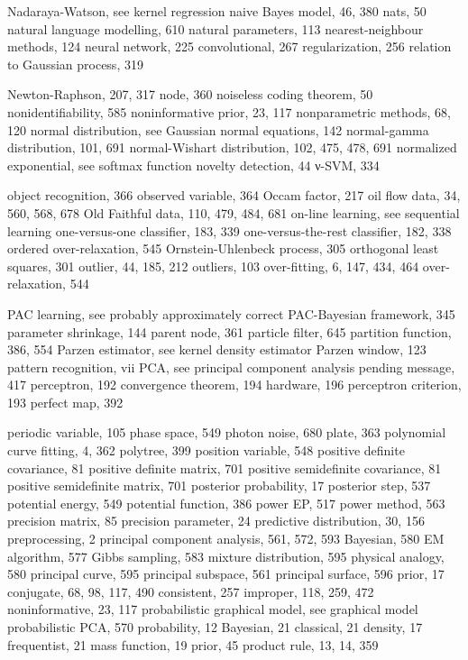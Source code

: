 \documentclass[
  10
]{article}
\begin{document}
Nadaraya-Watson, see kernel regression naive Bayes model, 46, 380 nats,
50 natural language modelling, 610 natural parameters, 113
nearest-neighbour methods, 124 neural network, 225 convolutional, 267
regularization, 256 relation to Gaussian process, 319

Newton-Raphson, 207, 317 node, 360 noiseless coding theorem, 50
nonidentifiability, 585 noninformative prior, 23, 117 nonparametric
methods, 68, 120 normal distribution, see Gaussian normal equations, 142
normal-gamma distribution, 101, 691 normal-Wishart distribution, 102,
475, 478, 691 normalized exponential, see softmax function novelty
detection, 44 ν-SVM, 334

object recognition, 366 observed variable, 364 Occam factor, 217 oil
flow data, 34, 560, 568, 678 Old Faithful data, 110, 479, 484, 681
on-line learning, see sequential learning one-versus-one classifier,
183, 339 one-versus-the-rest classifier, 182, 338 ordered
over-relaxation, 545 Ornstein-Uhlenbeck process, 305 orthogonal least
squares, 301 outlier, 44, 185, 212 outliers, 103 over-fitting, 6, 147,
434, 464 over-relaxation, 544

PAC learning, see probably approximately correct PAC-Bayesian framework,
345 parameter shrinkage, 144 parent node, 361 particle filter, 645
partition function, 386, 554 Parzen estimator, see kernel density
estimator Parzen window, 123 pattern recognition, vii PCA, see principal
component analysis pending message, 417 perceptron, 192 convergence
theorem, 194 hardware, 196 perceptron criterion, 193 perfect map, 392

periodic variable, 105 phase space, 549 photon noise, 680 plate, 363
polynomial curve fitting, 4, 362 polytree, 399 position variable, 548
positive definite covariance, 81 positive definite matrix, 701 positive
semidefinite covariance, 81 positive semidefinite matrix, 701 posterior
probability, 17 posterior step, 537 potential energy, 549 potential
function, 386 power EP, 517 power method, 563 precision matrix, 85
precision parameter, 24 predictive distribution, 30, 156 preprocessing,
2 principal component analysis, 561, 572, 593 Bayesian, 580 EM
algorithm, 577 Gibbs sampling, 583 mixture distribution, 595 physical
analogy, 580 principal curve, 595 principal subspace, 561 principal
surface, 596 prior, 17 conjugate, 68, 98, 117, 490 consistent, 257
improper, 118, 259, 472 noninformative, 23, 117 probabilistic graphical
model, see graphical model probabilistic PCA, 570 probability, 12
Bayesian, 21 classical, 21 density, 17 frequentist, 21 mass function, 19
prior, 45 product rule, 13, 14, 359
\end{document}
